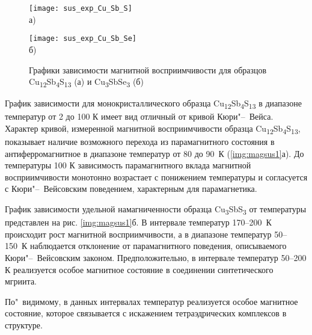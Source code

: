 \begin{figure}[pt!]
  \begin{minipage}[ht]{0.9\linewidth}\centering
    \texttt{[image: sus\_exp\_Cu\_Sb\_S]} \\ а)
  \end{minipage}
\vfill
  \begin{minipage}[ht]{0.9\linewidth}\centering
    \texttt{[image: sus\_exp\_Cu\_Sb\_Se]} \\ б)
  \end{minipage}
      \caption[Графики зависимости магнитной восприимчивости для образцов Cu\textsubscript{12}Sb\textsubscript{4}S\textsubscript{13} (а) и Cu\textsubscript{3}SbSe\textsubscript{3} (б)]{Графики зависимости магнитной восприимчивости для образцов Cu\textsubscript{12}Sb\textsubscript{4}S\textsubscript{13} (а) и Cu\textsubscript{3}SbSe\textsubscript{3} (б)}
    \label{img:magsus2}
\end{figure}

График зависимости для монокристаллического образца Cu\textsubscript{12}Sb\textsubscript{4}S\textsubscript{13} в диапазоне температур от 2 до 100 К имеет вид отличный от кривой Кюри"--~Вейса.
 Характер кривой, измеренной магнитной восприимчивости образца  Cu\textsubscript{12}Sb\textsubscript{4}S\textsubscript{13}, показывает наличие возможного перехода из парамагнитного состояния в антиферромагнитное в диапазоне температур от 80 до 90~К (\ref{img:magsus1}а).
До температуры 100 К зависимость парамагнитного вклада магнитной восприимчивости монотонно возрастает с понижением температуры и согласуется с Кюри"--~Вейсовским поведением, характерным для парамагнетика.

График зависимости удельной намагниченности образца Cu\textsubscript{3}SbS\textsubscript{3} от температуры представлен на рис. \ref{img:magsus1}б.
В интервале температур 170--200~К происходит рост магнитной восприимчивости, а в диапазоне температур 50--150~К наблюдается отклонение от парамагнитного поведения, описываемого Кюри"--~Вейсовским законом.
Предположительно, в интервале температур 50--200 К реализуется особое магнитное состояние в соединении синтетического мгриита.


По"~видимому, в данных интервалах температур реализуется особое магнитное состояние, которое связывается с искажением тетраэдрических комплексов в структуре.

\newpage



